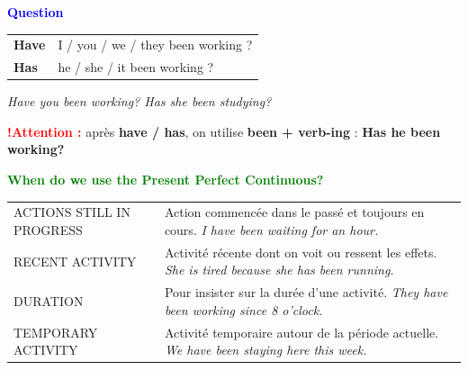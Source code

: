 \documentclass[a4paper,10pt]{article}
\newcommand{\sectiontitle}[2]{%
  {\large\bfseries\textcolor{#1}{#2}}%
}
\begin{document}
\begin{bluebox}
  \sectiontitle{Blue}{Question}

  \vspace{0.75mm}
  \begin{tabularx}{\textwidth}{@{}>{\color{Blue}\bfseries}l X@{}}
    Have & I / you / we / they been working ?\\
    Has & he / she / it been working ?
  \end{tabularx}

  \vspace{0.75mm}
  \textit{Have you been working? \qquad Has she been studying?}

  \vspace{1mm}
  \begin{tcolorbox}[
    colback=RedLight,colframe=RedLight,boxrule=0pt,
    arc=2mm,left=2.7mm,right=2.7mm,top=1.25mm,bottom=1.25mm
  ]
    \textcolor{Red}{\bfseries !\quad Attention :}
    après \textbf{have / has}, on utilise \textbf{been + verb-ing} :
    \textbf{Has he been working?}
  \end{tcolorbox}
\end{bluebox}

\vspace{1.35mm}

\begin{greenbox}
  \sectiontitle{Green}{When do we use the Present Perfect Continuous?}

  \vspace{1mm}

  \begin{tabularx}{\textwidth}{@{}p{} X@{}}
    ACTIONS STILL IN PROGRESS &
      Action commencée dans le passé et toujours en cours.
      \newline \textit{I have been waiting for an hour.}\\[0.7mm]

    RECENT ACTIVITY &
      Activité récente dont on voit ou ressent les effets.
      \newline \textit{She is tired because she has been running.}\\[0.7mm]

    DURATION &
      Pour insister sur la durée d'une activité.
      \newline \textit{They have been working since 8 o'clock.}\\[0.7mm]

    TEMPORARY ACTIVITY &
      Activité temporaire autour de la période actuelle.
      \newline \textit{We have been staying here this week.}
  \end{tabularx}
\end{greenbox}
\end{document}
